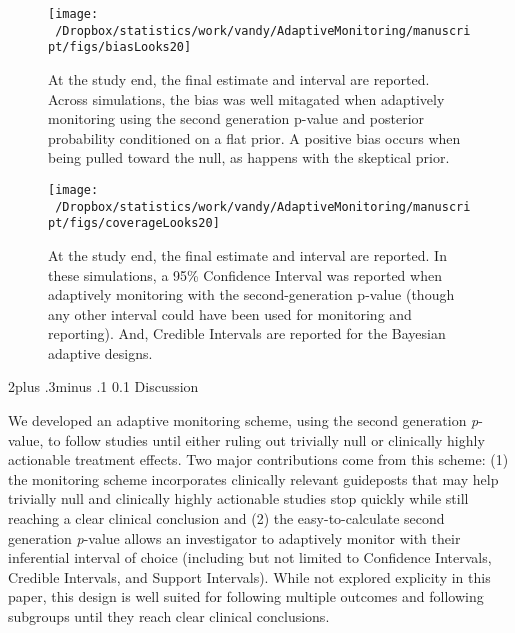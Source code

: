\documentclass[12pt,oneside]{book}
\makeatletter
\newlength{\li}\setlength{\li}{14.48pt}
\newlength{\di}\setlength{\di}{-3.5mm}
\renewcommand\section{ \@startsection {section}{1}{\z@}%
    {2\@bls  plus .3\@bls minus .1\@bls}%
    {0.1\@bls}%
    {\centering\normalfont}}
\theoremstyle{definition}
\theoremstyle{definition}
\theoremstyle{definition}
\theoremstyle{remark}
\makeatother
\begin{document}
\begin{figure}[H]

{\centering \texttt{[image: ~/Dropbox/statistics/work/vandy/AdaptiveMonitoring/manuscript/figs/biasLooks20]} 

}

\caption{At the study end, the final estimate and interval are reported.  Across simulations, the bias was well mitagated when adaptively monitoring using the second generation p-value and posterior probability conditioned on a flat prior.  A positive bias occurs when being pulled toward the null, as happens with the skeptical prior.}\label{fig:bias}
\end{figure}

\begin{figure}[H]

{\centering \texttt{[image: ~/Dropbox/statistics/work/vandy/AdaptiveMonitoring/manuscript/figs/coverageLooks20]} 

}

\caption{At the study end, the final estimate and interval are reported.  In these simulations, a 95\% Confidence Interval was reported when adaptively monitoring with the second-generation p-value (though any other interval could have been used for monitoring and reporting).  And, Credible Intervals are reported for the Bayesian adaptive designs.}\label{fig:coverage}
\end{figure}

\hypertarget{discussion}{%
\section{Discussion}\label{discussion}}

We developed an adaptive monitoring scheme, using the second generation
\emph{p}-value, to follow studies until either ruling out trivially null
or clinically highly actionable treatment effects. Two major
contributions come from this scheme: (1) the monitoring scheme
incorporates clinically relevant guideposts that may help trivially null
and clinically highly actionable studies stop quickly while still
reaching a clear clinical conclusion and (2) the easy-to-calculate
second generation \emph{p}-value allows an investigator to adaptively
monitor with their inferential interval of choice (including but not
limited to Confidence Intervals, Credible Intervals, and Support
Intervals). While not explored explicity in this paper, this design is
well suited for following multiple outcomes and following subgroups
until they reach clear clinical conclusions.
\end{document}
